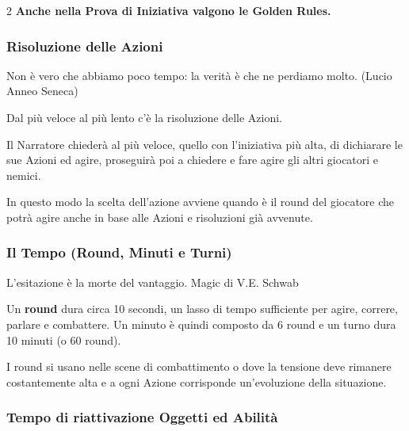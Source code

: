 \begin{multicols}{2}
\textbf{Anche nella Prova di Iniziativa valgono le Golden Rules.}

\subsubsection{Risoluzione delle Azioni}\label{risoluzionedelleazioni}

\begin{enfasi}{
Non è vero che abbiamo poco tempo: la verità è che ne perdiamo molto. (Lucio Anneo Seneca)
}
\end{enfasi}

Dal più veloce al più lento c'è la risoluzione delle Azioni.

Il Narratore chiederà al più veloce, quello con l'iniziativa più alta, di dichiarare le sue Azioni ed agire, proseguirà poi a chiedere e fare agire gli altri giocatori e nemici.

In questo modo la scelta dell'azione avviene quando è il round del giocatore che potrà agire anche in base alle Azioni e risoluzioni già avvenute.


\subsubsection{Il Tempo (Round, Minuti e Turni)}\label{iltempo}

\begin{enfasi}{L'esitazione è la morte del vantaggio. Magic di V.E. Schwab} \end{enfasi}

Un \textbf{round} dura circa 10 secondi, un lasso di tempo sufficiente per agire, correre, parlare e combattere. Un minuto è quindi composto da 6 round e un turno dura 10 minuti (o 60 round).

I round si usano nelle scene di combattimento o dove la tensione deve rimanere costantemente alta e a ogni Azione corrisponde un'evoluzione della situazione.

\subsubsection{Tempo di riattivazione Oggetti ed Abilità}\label{temporiattivazioneoggetti}


\end{multicols}
